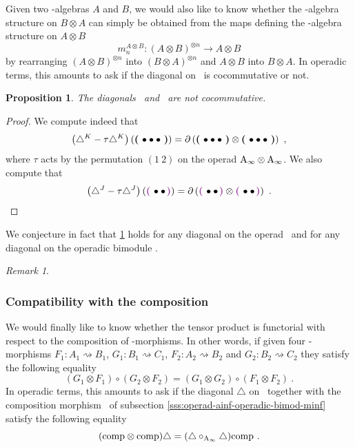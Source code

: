 \documentclass[twoside, 12pt]{amsart}
\newtheorem{proposition}[definition]{Proposition}
\theoremstyle{remark}
\newtheorem{remark}[definition]{\sc Remark}
\begin{document}
Given two \Ainf -algebras $A$ and $B$, we would also like to know whether the \Ainf -algebra structure on $B \otimes A$ can simply be obtained from the maps defining the \Ainf -algebra structure on $A \otimes B$ \[ m_n^{A \otimes B} : ( A \otimes B)^{\otimes n} \rightarrow A \otimes B \] by rearranging $(A \otimes B)^{\otimes n}$ into $(B \otimes A)^{\otimes n}$ and $A \otimes B$ into $B \otimes A$. In operadic terms, this amounts to ask if the diagonal on \Ainf\ is cocommutative or not. 

\begin{proposition} \label{prop:not-cocomm}
The diagonals \diagainf\ and \diagminf\ are not cocommutative.
\end{proposition} 

\begin{proof}
We compute indeed that
\[ \left( \triangle^{K} - \tau \triangle^{K} \right) \left( \boldsymbol{\left(\right.}  \bullet \bullet \bullet  \boldsymbol{\left.\right)} \right) = \partial \left( \boldsymbol{\left(\right.}  \bullet \bullet \bullet  \boldsymbol{\left.\right)} \otimes \boldsymbol{\left(\right.}  \bullet \bullet \bullet  \boldsymbol{\left.\right)} \right) \ , \]
where $\tau$ acts by the permutation $(1 \ 2)$ on the operad $\mathrm{A}_\infty \otimes \mathrm{A}_\infty$.
We also compute that
\[ \left( \diagminf - \tau \diagminf \right) \left( \purple{\bullet \bullet} \right) = \partial \left( \purple{\bullet \bullet} \otimes \purple{\bullet \bullet} \right) \ . \]
\end{proof}

\noindent We conjecture in fact that \cref{prop:not-cocomm} holds for any diagonal on the operad \Ainf\ and for any diagonal on the operadic bimodule \Minf .

\begin{remark}
\end{remark}
 
\subsubsection{Compatibility with the composition} \label{sss:comp-composition}

We would finally like to know whether the tensor product is functorial with respect to the composition of \Ainf -morphisms. 
In other words, if given four \Ainf -morphisms $F_1 : A_1 \rightsquigarrow B_1$, 
$G_1 : B_1 \rightsquigarrow C_1$, $F_2 : A_2 \rightsquigarrow B_2$ and
$G_2 : B_2 \rightsquigarrow C_2$ they satisfy the following equality
\[ ( G_1 \otimes F_1) \circ (G_2 \otimes F_2) = (G_1 \otimes G_2) \circ (F_1 \otimes F_2) \ . \]
In operadic terms, this amounts to ask if the diagonal $\triangle$ on \Minf\ together with the composition morphism \comp\ of subsection \ref{sss:operad-ainf-operadic-bimod-minf} satisfy the following equality 
\[ ( \mathrm{comp} \otimes \mathrm{comp} ) \triangle = (\triangle \circ_{\mathrm{A}_\infty} \triangle ) \mathrm{comp}   \ . \]
\end{document}
